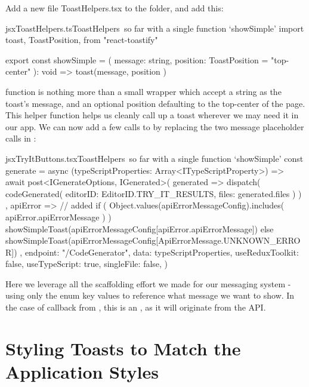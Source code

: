 \documentclass[paper=6in:9in,pagesize=pdftex,headinclude=on,footinclude=on,12pt,twoside]{scrbook}
\begin{document}
Add a new file {ToastHelpers.tsx} to the  folder, and add this:

\begin{codeInput}{jsx}{ToastHelpers.ts}{ToastHelpers\, so far with a single function `showSimple'}
import {
  toast,
  ToastPosition,
} from "react-toastify"

export const showSimple = (
  message: string,
  position: ToastPosition = "top-center"
): void => {
  toast(message, { position })
}  
\end{codeInput}

 function is nothing more than a small wrapper which accept a string as the toast's message, and an optional position defaulting to the top-center of the page. This helper function helps us cleanly call up a toast wherever we may need it in our app. We can now add a few calls to  by replacing the two message placeholder  calls in :

\begin{codeInput}{jsx}{TryItButtons.tsx}{ToastHelpers\, so far with a single function `showSimple'}
const generate = async (typeScriptProperties: Array<ITypeScriptProperty>) => {
  await post<IGenerateOptions, IGenerated>(
    generated => {
      dispatch(
        codeGenerated({
          editorID: EditorID.TRY_IT_RESULTS,
          files: generated.files
        })
      )
    },
    apiError => {
      // added
      if (
        Object.values(apiErrorMessageConfig).includes(
          apiError.apiErrorMessage
        )
      ) {
        showSimpleToast(apiErrorMessageConfig[apiError.apiErrorMessage])
      } else {
        showSimpleToast(apiErrorMessageConfig[ApiErrorMessage.UNKNOWN_ERROR])
      }
    },
    {
      endpoint: "/CodeGenerator",
      data: {
        typeScriptProperties,
        useReduxToolkit: false,
        useTypeScript: true,
        singleFile: false,
      }
    }
  )
}
\end{codeInput}

Here we leverage all the scaffolding effort we made for our messaging system - using only the enum key values to reference what message we want to show. In the case of  callback from , this is an , as it will originate from the API.

\section{Styling Toasts to Match the Application Styles}
\end{document}
